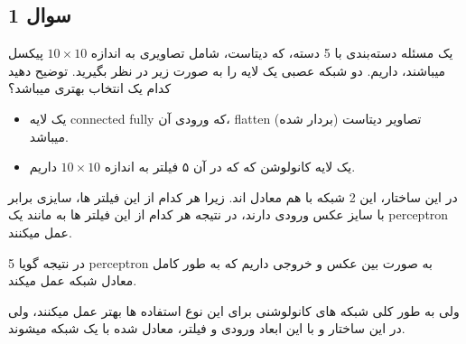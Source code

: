 \subsection{سوال 1}

یک مسئله دستەبندی با 5 دسته، که دیتاست، شامل تصاویری به اندازه $10\times10$ پیکسل میباشند، داریم. دو
شبکه عصبی یک لایه را به صورت زیر در نظر بگیرید. توضیح دهید کدام یک انتخاب بهتری میباشد؟

\begin{itemize}
    \item {
        یک لایه connected fully که ورودی آن، flatten (بردار شده) تصاویر دیتاست میباشد.
    }
    \item {
        یک لایه کانولوشن که که در آن ۵ فیلتر به اندازه $10\times10$ داریم.
    }
\end{itemize}

\begin{qsolve}[]
    در این ساختار، این 2 شبکه با هم معادل اند.
    زیرا هر کدام از این فیلتر ها، سایزی برابر با سایز عکس ورودی دارند، در نتیجه هر کدام از این 
    فیلتر ها به مانند یک perceptron عمل میکنند.

    در نتیجه گویا 5 perceptron به صورت  بین عکس و خروجی داریم که به طور کامل معادل شبکه
     عمل میکند.
    
    ولی به طور کلی شبکه های کانولوشنی برای این نوع استفاده ها بهتر عمل میکنند، ولی در این ساختار و با این ابعاد ورودی و 
    فیلتر، معادل شده با یک شبکه  میشوند.
\end{qsolve}